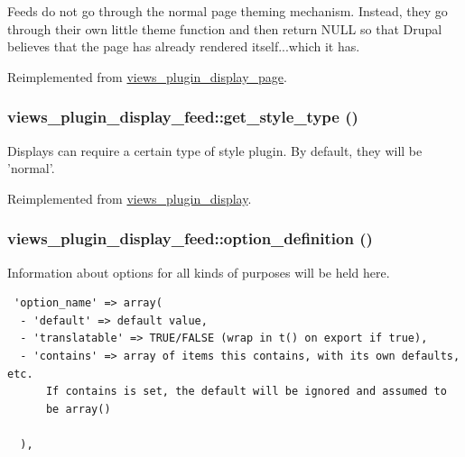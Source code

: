 Feeds do not go through the normal page theming mechanism. Instead, they go through their own little theme function and then return NULL so that Drupal believes that the page has already rendered itself...which it has. 

Reimplemented from \hyperlink{classviews__plugin__display__page_943b71fc873e5d09f548b69ba314b674}{views\_\-plugin\_\-display\_\-page}.\hypertarget{classviews__plugin__display__feed_9a7886409056fe5906021a70d2f41c14}{
\subsubsection[{get\_\-style\_\-type}]{\setlength{\rightskip}{0pt plus 5cm}views\_\-plugin\_\-display\_\-feed::get\_\-style\_\-type ()}}
\label{classviews__plugin__display__feed_9a7886409056fe5906021a70d2f41c14}


Displays can require a certain type of style plugin. By default, they will be 'normal'. 

Reimplemented from \hyperlink{classviews__plugin__display_03f77cb37c3c3219d031c153aa59d20e}{views\_\-plugin\_\-display}.\hypertarget{classviews__plugin__display__feed_9f737ab801100dafa8f1020c0737b598}{
\subsubsection[{option\_\-definition}]{\setlength{\rightskip}{0pt plus 5cm}views\_\-plugin\_\-display\_\-feed::option\_\-definition ()}}
\label{classviews__plugin__display__feed_9f737ab801100dafa8f1020c0737b598}


Information about options for all kinds of purposes will be held here. 

\begin{Code}\begin{verbatim} 'option_name' => array(
  - 'default' => default value,
  - 'translatable' => TRUE/FALSE (wrap in t() on export if true),
  - 'contains' => array of items this contains, with its own defaults, etc.
      If contains is set, the default will be ignored and assumed to
      be array()

  ),
\end{verbatim}
\end{Code}

